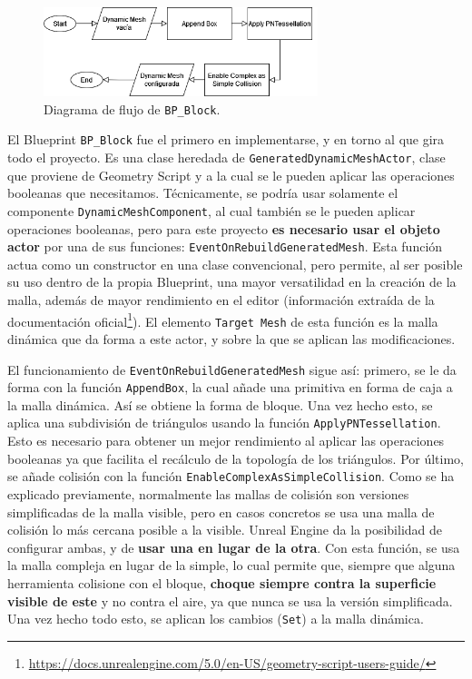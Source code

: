 \begin{figure}[H]
	\centering
	\includegraphics[width=8cm]{imagenes/flowchart1}
	\caption{Diagrama de flujo de \texttt{BP\_Block}.}
	\label{fig:fc1}
\end{figure}

El Blueprint \texttt{BP\_Block} fue el primero en implementarse, y en torno al que gira todo el proyecto. Es una clase heredada de \texttt{GeneratedDynamicMeshActor}, clase que proviene de Geometry Script y a la cual se le pueden aplicar las operaciones booleanas que necesitamos. Técnicamente, se podría usar solamente el componente \texttt{DynamicMeshComponent}, al cual también se le pueden aplicar operaciones booleanas, pero para este proyecto \textbf{es necesario usar el objeto actor} por una de sus funciones: \texttt{EventOnRebuildGeneratedMesh}. Esta función actua como un constructor en una clase convencional, pero permite, al ser posible su uso dentro de la propia Blueprint, una mayor versatilidad en la creación de la malla, además de mayor rendimiento en el editor (información extraída de la documentación oficial\footnote{\url{https://docs.unrealengine.com/5.0/en-US/geometry-script-users-guide/}}). El elemento \texttt{Target Mesh} de esta función es la malla dinámica que da forma a este actor, y sobre la que se aplican las modificaciones.

El funcionamiento de \texttt{EventOnRebuildGeneratedMesh} sigue así: primero, se le da forma con la función \texttt{AppendBox}, la cual añade una primitiva en forma de caja a la malla dinámica. Así se obtiene la forma de bloque. Una vez hecho esto, se aplica una subdivisión de triángulos usando la función \texttt{ApplyPNTessellation}. Esto es necesario para obtener un mejor rendimiento al aplicar las operaciones booleanas ya que facilita el recálculo de la topología de los triángulos. Por último, se añade colisión con la función \texttt{EnableComplexAsSimpleCollision}. Como se ha explicado previamente, normalmente las mallas de colisión son versiones simplificadas de la malla visible, pero en casos concretos se usa una malla de colisión lo más cercana posible a la visible. Unreal Engine da la posibilidad de configurar ambas, y de \textbf{usar una en lugar de la otra}. Con esta función, se usa la malla compleja en lugar de la simple, lo cual permite que, siempre que alguna herramienta colisione con el bloque, \textbf{choque siempre contra la superficie visible de este} y no contra el aire, ya que nunca se usa la versión simplificada. Una vez hecho todo esto, se aplican los cambios (\texttt{Set}) a la malla dinámica.

